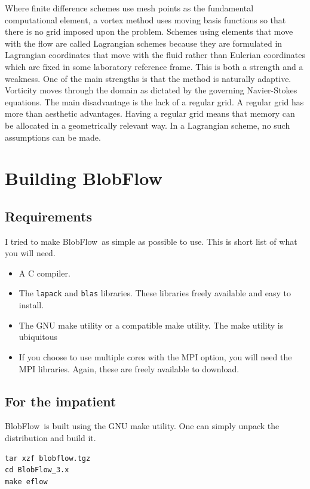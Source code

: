 \documentclass[12pt]{report}
\newcommand{\BF}{BlobFlow}
\begin{document}
Where finite
difference schemes use mesh points as the fundamental computational element,
a vortex method uses moving basis functions so that there is no grid imposed
upon the problem.  Schemes using elements that move with the flow are called
Lagrangian schemes because they are formulated in Lagrangian coordinates
that move with the fluid rather than Eulerian coordinates which are fixed in
some laboratory reference frame.  This is both a strength and a weakness.
One of the main strengths is that the method is naturally adaptive.
Vorticity moves through the domain as dictated by the governing
Navier-Stokes equations.  The main disadvantage is the lack of a regular
grid.  A regular grid has more than aesthetic advantages.  Having a regular
grid means that memory can be allocated in a geometrically relevant way.
In a Lagrangian scheme, no such assumptions can be made.

\chapter{Building \BF}

\section{Requirements}

I tried to make \BF~as simple as possible to use.  This is short list of what
you will need.

\begin{itemize}
 \item A C compiler.
\item The \texttt{lapack} and \texttt{blas} libraries.  These libraries freely
available and easy to install.
\item The GNU make utility or a compatible make utility.  The make utility is
ubiquitous
\item If you choose to use multiple cores with the MPI option, you will need
the MPI libraries.  Again, these are freely available to download.
\end{itemize}


\section{For the impatient}

\BF~is built using the GNU make utility.  One can simply unpack the distribution
and build it.

\begin{verbatim}
tar xzf blobflow.tgz
cd BlobFlow_3.x
make eflow
\end{verbatim}
\end{document}
